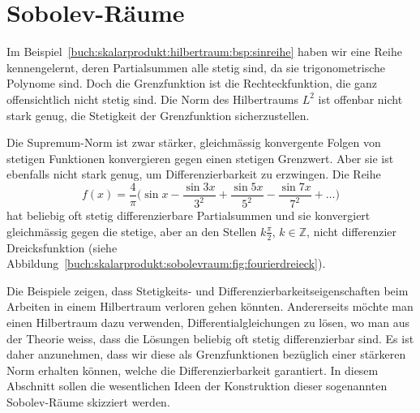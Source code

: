 %
%
%
\section{Sobolev-Räume
\label{buch:skalarprodukt:section:sobolev}}
Im Beispiel~\ref{buch:skalarprodukt:hilbertraum:bsp:sinreihe} haben 
wir eine Reihe kennengelernt, deren Partialsummen alle stetig sind,
da sie trigonometrische Polynome sind.
Doch die Grenzfunktion ist die Rechteckfunktion, die ganz offensichtlich
nicht stetig sind.
Die Norm des Hilbertraums $L^2$ ist offenbar nicht stark genug, die
Stetigkeit der Grenzfunktion sicherzustellen.

%
Die Supremum-Norm ist zwar stärker, gleichmässig konvergente Folgen
von stetigen Funktionen konvergieren gegen einen stetigen Grenzwert.
Aber sie ist ebenfalls nicht stark genug, um Differenzierbarkeit zu erzwingen.
Die Reihe
\begin{equation}
f(x)
=
\frac{4}{\pi}\biggl(
\sin x - \frac{\sin 3x}{3^2} + \frac{\sin 5x}{5^2} -\frac{\sin 7x}{7^2} +\dots
\biggr)
\label{buch:skalarprodukt:sobolevraum:eqn:fourierdreieck}
\end{equation}
hat beliebig oft stetig differenzierbare Partialsummen und sie konvergiert
gleichmässig gegen die stetige, aber an den Stellen $k\frac{\pi}2$,
$k\in\mathbb{Z}$, nicht differenzier Dreicksfunktion (siehe
Abbildung~\ref{buch:skalarprodukt:sobolevraum:fig:fourierdreieck}).

Die Beispiele zeigen, dass Stetigkeits- und Differenzierbarkeitseigenschaften
beim Arbeiten in einem Hilbertraum verloren gehen könnten.
Andererseits möchte man einen Hilbertraum dazu verwenden,
Differentialgleichungen zu lösen, wo man aus der Theorie weiss, dass
die Lösungen beliebig oft stetig differenzierbar sind.
Es ist daher anzunehmen, dass wir diese als Grenzfunktionen bezüglich
einer stärkeren Norm erhalten können, welche die Differenzierbarkeit
garantiert.
In diesem Abschnitt sollen die wesentlichen Ideen der Konstruktion
dieser sogenannten Sobolev-Räume skizziert werden.

%
%
